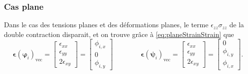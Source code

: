 \documentclass[12pt]{article}
\newcommand{\strain}{\boldsymbol{\epsilon}}
\newcommand{\shapeu}{\boldsymbol{\varphi}}
\newcommand{\shapev}{\boldsymbol{\psi}}
\begin{document}
\subsubsection{Cas plane}
Dans le cas des tensions planes et des déformations planes, le terme 
$\epsilon_{zz} \sigma_{zz}$ de la double contraction disparait, et on trouve
grâce à \eqref{eq:planeStrainStrain} que
\begin{equation}
    \strain(\shapeu_{i})_{\textrm{vec}} = 
    \begin{bmatrix}
        \epsilon_{xx} \\
        \epsilon_{yy} \\
        2\epsilon_{xy}
    \end{bmatrix} = 
    \begin{bmatrix}
        \phi_{i,x}\\
        0\\
        \phi_{i,y}
    \end{bmatrix} \qquad\qquad
    \strain(\shapev_{i})_{\textrm{vec}} = 
    \begin{bmatrix}
        \epsilon_{xx} \\
        \epsilon_{yy} \\
        2\epsilon_{xy}
    \end{bmatrix} = 
    \begin{bmatrix}
        0\\
        \phi_{i,y}\\
        \phi_{i,x}
    \end{bmatrix}.
\end{equation}
\end{document}
